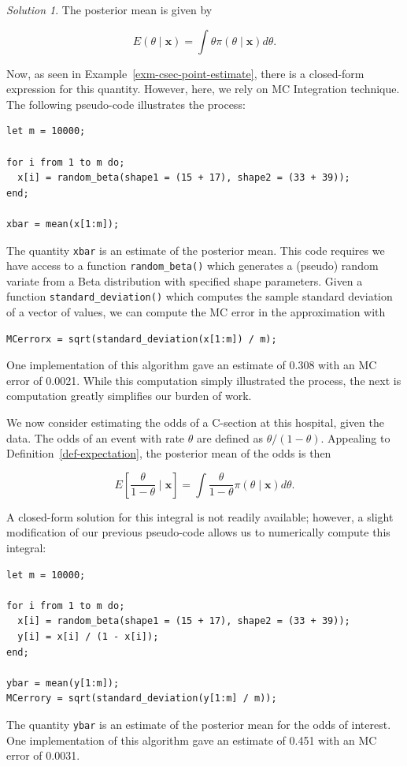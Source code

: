 \documentclass[
  letterpaper,
  DIV=11,
  numbers=noendperiod]{scrreprt}
\theoremstyle{definition}
\theoremstyle{plain}
\theoremstyle{definition}
\theoremstyle{remark}
\newtheorem*{solution}{Solution}
\begin{document}
\begin{solution}

The posterior mean is given by

\[E\left(\theta \mid \mathbf{x}\right) = \int \theta \pi(\theta \mid \mathbf{x}) d\theta.\]

Now, as seen in Example~\ref{exm-csec-point-estimate}, there is a
closed-form expression for this quantity. However, here, we rely on MC
Integration technique. The following pseudo-code illustrates the
process:

\begin{verbatim}
let m = 10000;

for i from 1 to m do;
  x[i] = random_beta(shape1 = (15 + 17), shape2 = (33 + 39));
end;
  
xbar = mean(x[1:m]);
\end{verbatim}

The quantity \texttt{xbar} is an estimate of the posterior mean. This
code requires we have access to a function \texttt{random\_beta()} which
generates a (pseudo) random variate from a Beta distribution with
specified shape parameters. Given a function
\texttt{standard\_deviation()} which computes the sample standard
deviation of a vector of values, we can compute the MC error in the
approximation with

\begin{verbatim}
MCerrorx = sqrt(standard_deviation(x[1:m]) / m);
\end{verbatim}

One implementation of this algorithm gave an estimate of 0.308 with an
MC error of 0.0021. While this computation simply illustrated the
process, the next is computation greatly simplifies our burden of work.

We now consider estimating the odds of a C-section at this hospital,
given the data. The odds of an event with rate \(\theta\) are defined as
\(\theta / (1 - \theta)\). Appealing to
Definition~\ref{def-expectation}, the posterior mean of the odds is then

\[E\left[\frac{\theta}{1 - \theta} \mid \mathbf{x}\right] = \int \frac{\theta}{1-\theta} \pi(\theta \mid \mathbf{x}) d\theta.\]

A closed-form solution for this integral is not readily available;
however, a slight modification of our previous pseudo-code allows us to
numerically compute this integral:

\begin{verbatim}
let m = 10000;

for i from 1 to m do;
  x[i] = random_beta(shape1 = (15 + 17), shape2 = (33 + 39));
  y[i] = x[i] / (1 - x[i]);
end;
  
ybar = mean(y[1:m]);
MCerrory = sqrt(standard_deviation(y[1:m] / m));
\end{verbatim}

The quantity \texttt{ybar} is an estimate of the posterior mean for the
odds of interest. One implementation of this algorithm gave an estimate
of 0.451 with an MC error of 0.0031.

\end{solution}
\end{document}
